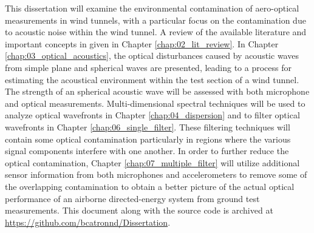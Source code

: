 This dissertation will examine the environmental contamination of aero-optical measurements in wind tunnels, with a particular focus on the contamination due to acoustic noise within the wind tunnel.
A review of the available literature and important concepts in given in Chapter \ref{chap:02_lit_review}.
In Chapter \ref{chap:03_optical_acoustics}, the optical disturbances caused by acoustic waves from simple plane and spherical waves are presented, leading to a process for estimating the acoustical environment within the test section of a wind tunnel.
The strength of an spherical acoustic wave will be assessed with both microphone and optical measurements.
Multi-dimensional spectral techniques will be used to analyze optical wavefronts in Chapter \ref{chap:04_dispersion} and to filter optical wavefronts in Chapter \ref{chap:06_single_filter}.
These filtering techniques will contain some optical contamination particularly in regions where the various signal components interfere with one another.
In order to further reduce the optical contamination, Chapter \ref{chap:07_multiple_filter} will utilize additional sensor information from both microphones and accelerometers to remove some of the overlapping contamination to obtain a better picture of the actual optical performance of an airborne directed-energy system from ground test measurements.
This document along with the source code is archived at \url{https://github.com/bcatronnd/Dissertation}.
